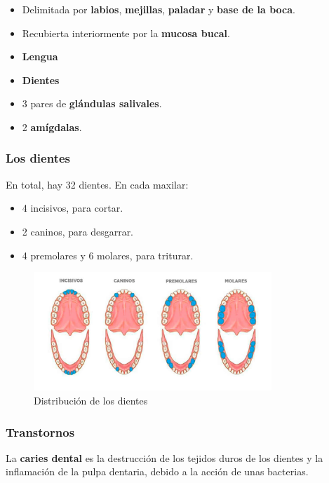 \documentclass{article}
\begin{document}
				\begin{itemize}
					\item Delimitada por \textbf{labios}, \textbf{mejillas}, \textbf{paladar} y \textbf{base de la boca}.
					\item Recubierta interiormente por la \textbf{mucosa bucal}.
					\item \textbf{Lengua}
					\item \textbf{Dientes}
					\item 3 pares de \textbf{glándulas salivales}.
					\item 2 \textbf{amígdalas}.
				\end{itemize}
				
			\subsubsection*{Los dientes}
			
				En total, hay 32 dientes. En cada maxilar:
				\begin{itemize}
					\item 4 incisivos, para cortar.
					\item 2 caninos, para desgarrar.
					\item 4 premolares y 6 molares, para triturar.
				\end{itemize}
				
				\begin{figure}[htp]
					\centering
					\includegraphics[width=0.8\textwidth]{dientes}
					\caption{Distribución de los dientes}
					\label{fig:dientes}
				\end{figure}
			
			\subsubsection*{Transtornos}
			
				La \textbf{caries dental} es la destrucción de los tejidos duros de los dientes y la inflamación de la pulpa dentaria, debido a la acción de unas bacterias.
				
\end{document}
